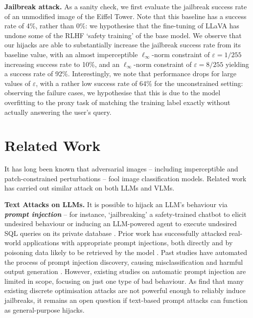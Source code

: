 \documentclass{article} %
\newcommand{\vocab}[1]{\textit{\textbf{#1}}}
\begin{document}
\textbf{Jailbreak attack.} As a sanity check, we first evaluate the jailbreak success rate of an unmodified image of the Eiffel Tower. Note that this baseline has a success rate of 4\%, rather than 0\%: we hypothesise that the fine-tuning of LLaVA has undone some of the RLHF `safety training' of the base model. We observe that our hijacks are able to substantially increase the jailbreak success rate from its baseline value, with an almost imperceptible $\ell_\infty$-norm constraint of $\varepsilon=1/255$ increasing success rate to 10\%, and an $\ell_\infty$-norm constraint of $\varepsilon=8/255$ yielding a success rate of 92\%. Interestingly, we note that performance drops for large values of $\varepsilon$, with a rather low success rate of 64\% for the unconstrained setting: observing the failure cases, we hypothesise that this is due to the model overfitting to the proxy task of matching the training label exactly without actually answering the user's query.



\section{Related Work}

It has long been known that adversarial images \citep{szegedy2013intriguing, fgsm, dnnsAreEasilyFooled} -- including imperceptible \citep{physicalWorldAttack} and patch-constrained perturbations \citep{adversarialPatch} -- fool image classification models. Related work has carried out similar attack on both LLMs and VLMs.

\textbf{Text Attacks on LLMs.} It is possible to hijack an LLM's behaviour via \vocab{prompt injection} \citep{Perez2022} -- for instance, `jailbreaking' a safety-trained chatbot to elicit undesired behaviour \citep{wei2023jailbroken} or inducing an LLM-powered agent to execute undesired SQL queries on its private database \citep{Pedro2023}. Prior work has successfully attacked real-world applications with appropriate prompt injections, both directly \citep{Liu2023} and by poisoning data likely to be retrieved by the model \citep{Greshake2023}. Past studies have automated the process of prompt injection discovery, causing misclassification \citep{li2020bert} and harmful output generation \citep{jones2023automatically, zou2023universal}. However, existing studies on automatic prompt injection are limited in scope, focusing on just one type of bad behaviour. As \citet{carlini2023aligned} find that many existing discrete optimisation attacks are not powerful enough to reliably induce jailbreaks, it remains an open question if text-based prompt attacks can function as general-purpose hijacks.
\end{document}
